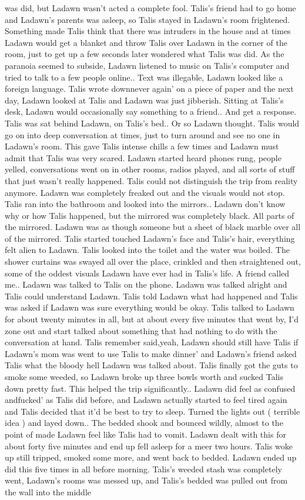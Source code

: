 \documentclass[12pt]{book}
\begin{document}
was did, but Ladawn wasn't acted a complete fool. Talis's friend had to go home and Ladawn's parents was asleep, so Talis stayed in Ladawn's room frightened. Something made Talis think that there was intruders in the house and at times Ladawn would get a blanket and throw Talis over Ladawn in the corner of the room, just to get up a few seconds later wondered what Talis was did. As the paranoia seemed to subside, Ladawn listened to music on Talis's computer and tried to talk to a few people online.. Text was illegable, Ladawn looked like a foreign language. Talis wrote downnever again' on a piece of paper and the next day, Ladawn looked at Talis and Ladawn was just jibberish. Sitting at Talis's desk, Ladawn would occasionally say something to a friend.. And get a response. Talis was sat behind Ladawn, on Talis's bed.. Or so Ladawn thought. Talis would go on into deep conversation at times, just to turn around and see no one in Ladawn's room. This gave Talis intense chills a few times and Ladawn must admit that Talis was very scared. Ladawn started heard phones rung, people yelled, conversations went on in other rooms, radios played, and all sorts of stuff that just wasn't really happened. Talis could not distinguish the trip from reality anymore. Ladawn was completely freaked out and the visuals would not stop. Talis ran into the bathroom and looked into the mirrors.. Ladawn don't know why or how Talis happened, but the mirrored was completely black. All parts of the mirrored. Ladawn was as though someone but a sheet of black marble over all of the mirrored. Talis started touched Ladawn's face and Talis's hair, everything felt alien to Ladawn. Talis looked into the toilet and the water was boiled. The shower curtains was swayed all over the place, crinkled and then straightened out, some of the oddest visuals Ladawn have ever had in Talis's life. A friend called me.. Ladawn was talked to Talis on the phone. Ladawn was talked alright and Talis could understand Ladawn. Talis told Ladawn what had happened and Talis was asked if Ladawn was sure everything would be okay. Talis talked to Ladawn for about twenty minutes in all, but at about every five minutes that went by, I'd zone out and start talked about something that had nothing to do with the conversation at hand. Talis remember said,yeah, Ladawn should still have Talis if Ladawn's mom was went to use Talis to make dinner' and Ladawn's friend asked Talis what the bloody hell Ladawn was talked about. Talis finally got the guts to smoke some weeded, so Ladawn broke up three bowls worth and sucked Talis down pretty fast. This helped the trip significantly.. Ladawn did feel as confused andfucked' as Talis did before, and Ladawn actually started to feel tired again and Talis decided that it'd be best to try to sleep. Turned the lights out ( terrible idea ) and layed down.. The bedded shook and bounced wildly, almost to the point of made Ladawn feel like Talis had to vomit. Ladawn dealt with this for about forty five minutes and end up fell asleep for a meer two hours. Talis woke up still tripped, smoked some more, and went back to bedded. Ladawn ended up did this five times in all before morning. Talis's weeded stash was completely went, Ladawn's rooms was messed up, and Talis's bedded was pulled out from the wall into the middle 
\end{document}
